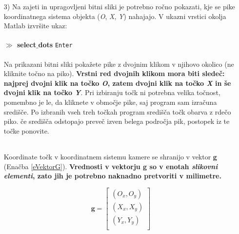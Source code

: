 \begin{enumerate}
\item[3)] Na zajeti in upragovljeni bitni sliki je potrebno ročno pokazati, kje se  %
pike koordinatnega sistema objekta (\emph{O}, \emph{X}, \emph{Y})  nahajajo. V ukazni vrstici okolja %
Matlab izvršite ukaz: \\ %
\vspace{-0.3cm}\\%
\textbf{$\gg$ select$\_$dots} \verb"Enter" \\ %
\vspace{-0.1cm}\\%
Na prikazani bitni sliki pokažete pike z dvojnim klikom v njihovo okolico (ne kliknite točno na piko). \textbf{Vrstni red dvojnih klikom mora biti sledeč:
najprej dvojni klik na  točko \emph{O}, zatem dvojni klik na točko \emph{X} in še dvojni klik na točko \emph{Y}}. Pri izbiranju točk ni potrebna velika točnost, %
pomembno je le, da kliknete v območje pike, saj program sam izračuna središče. Po izbranih %
vseh treh točkah program središča točk obarva z rdečo piko. če središča odstopajo preveč %
izven belega področja pik, postopek iz te točke ponovite. \\%
\\
\noindent %
\begin{mdframed}[backgroundcolor=blue!20, shadow=true,roundcorner=8pt]
        \vspace{0.1cm}
        Koordinate točk v koordinatnem sistemu kamere se shranijo v vektor \textbf{g} (Enačba \ref{eVektorG}). %
        \textbf{Vrednosti v vektorju g so v enotah %
        \emph{slikovni elementi}, zato jih je potrebno naknadno pretvoriti v milimetre.} %
        \vspace{0.1cm}
\end{mdframed}

\normalsize %
        \begin{equation}
            \textbf{g} =
            \begin{bmatrix}
                (O_x, O_y)  \\%
                (X_x, X_y)  \\%
                (Y_x, Y_y)  \\%
            \end{bmatrix}
            \label{eVektorG}
        \end{equation}
\vspace*{0.2cm} %



\end{enumerate}
